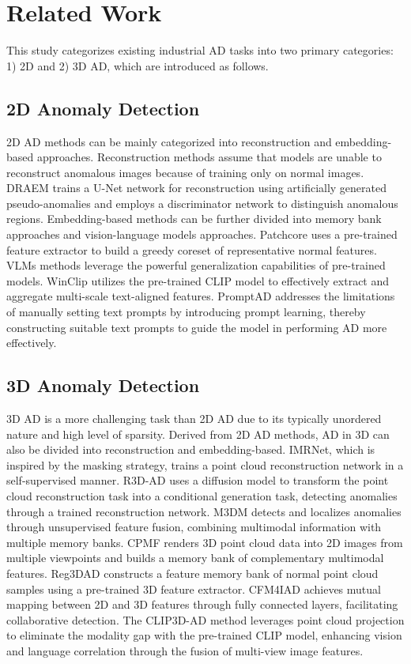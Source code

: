 \section{Related Work}
This study categorizes existing industrial AD tasks into two primary categories: 1) 2D and 2) 3D AD, which are introduced as follows.
\subsection{2D Anomaly Detection} 
2D AD methods can be mainly categorized into reconstruction and embedding-based approaches. Reconstruction methods assume that models are unable to reconstruct anomalous images because of training only on normal images\cite{zavrtanik2021draem,zhang2024realnet,xu2024afscti3}. DRAEM \cite{zavrtanik2021draem} trains a U-Net network for reconstruction using artificially generated pseudo-anomalies and employs a discriminator network to distinguish anomalous regions. Embedding-based methods can be further divided into memory bank approaches and vision-language models approaches\cite{RD,roth2022patchcore}. Patchcore \cite{roth2022patchcore} uses a pre-trained feature extractor to build a greedy coreset of representative normal features. VLMs methods leverage the powerful generalization capabilities of pre-trained models\cite{jeong2023winclip,li2024promptad}. WinClip \cite{jeong2023winclip} utilizes the pre-trained CLIP model to effectively extract and aggregate multi-scale text-aligned features. PromptAD \cite{li2024promptad} addresses the limitations of manually setting text prompts by introducing prompt learning, thereby constructing suitable text prompts to guide the model in performing AD more effectively.
\subsection{3D Anomaly Detection} 
3D AD is a more challenging task than 2D AD due to its typically unordered nature and high level of sparsity. Derived from 2D AD methods, AD in 3D can also be divided into reconstruction and embedding-based. IMRNet, which is inspired by the masking strategy, trains a point cloud reconstruction network in a self-supervised manner\cite{IMR}.  R3D-AD uses a diffusion model to transform the point cloud reconstruction task into a conditional generation task, detecting anomalies through a trained reconstruction network\cite{r3dad}. M3DM detects and localizes anomalies through unsupervised feature fusion, combining multimodal information with multiple memory banks\cite{wang2023m3dm}. CPMF renders 3D point cloud data into 2D images from multiple viewpoints and builds a memory bank of complementary multimodal features\cite{cao2024cpmf}. Reg3DAD constructs a feature memory bank of normal point cloud samples using a pre-trained 3D feature extractor\cite{liu2024real3d}. CFM4IAD achieves mutual mapping between 2D and 3D features through fully connected layers, facilitating collaborative detection\cite{CFM4IAD}. The CLIP3D-AD method \cite{zuo2024clip3dad} leverages point cloud projection to eliminate the modality gap with the pre-trained CLIP \cite{CLIP} model, enhancing vision and language correlation through the fusion of multi-view image features.